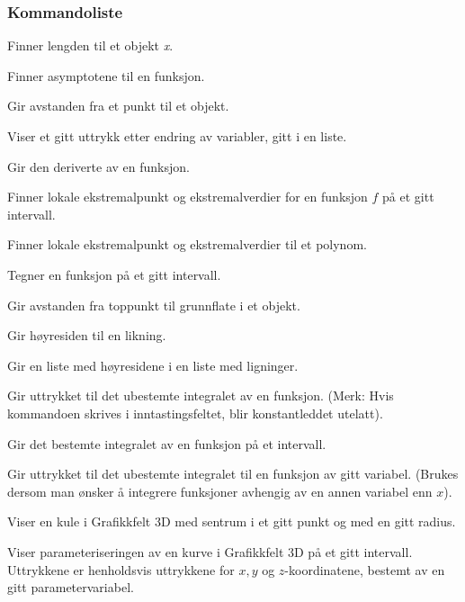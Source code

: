 \subsubsection{Kommandoliste}
{Finner lengden til et objekt \textit{x}.
}

{Finner asymptotene til en funksjon.}

{Gir avstanden fra et punkt til et objekt.}

{Viser et gitt uttrykk etter endring av variabler, gitt i en liste.}

{Gir den deriverte av en funksjon.
	
	}

 {Finner lokale ekstremalpunkt og ekstremalverdier for en funksjon $ f $ på et gitt intervall.}

{Finner lokale ekstremalpunkt og ekstremalverdier til et polynom.}

{Tegner en funksjon på et gitt intervall.}

{Gir avstanden fra toppunkt til grunnflate i et objekt. 
	}

{Gir høyresiden til en likning.}

{Gir en liste med høyresidene i en liste med ligninger.}

{Gir uttrykket til det ubestemte integralet av en funksjon. (Merk: Hvis kommandoen skrives i inntastingsfeltet, blir konstantleddet utelatt).}

{Gir det bestemte integralet av en funksjon på et intervall.}

{Gir uttrykket til det ubestemte integralet til en funksjon av gitt variabel. (Brukes dersom man ønsker å integrere funksjoner avhengig av en annen variabel enn $ x $).}

{Viser en kule i Grafikkfelt 3D med sentrum i et gitt punkt og med en gitt radius.}

{Viser parameteriseringen av en kurve i Grafikkfelt 3D på et gitt intervall. Uttrykkene er henholdsvis uttrykkene for $ {x, y} $ og $ z $-koordinatene, bestemt av en gitt parametervariabel.
	
}

